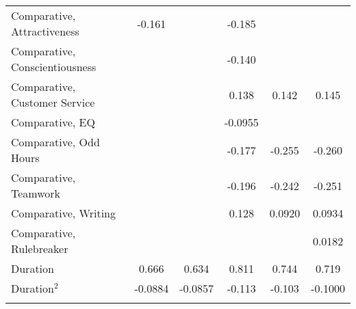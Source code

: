 {\begin{center}
{\begin{longtable}{l*{5}{c}}
Comparative, Attractiveness&                -0.161\sym{***}&                     &      -0.185\sym{*}  &                     &                     \\
\addlinespace
Comparative, Conscientiousness&                     &                     &      -0.140         &                     &                     \\
\addlinespace
Comparative, Customer Service&                     &                     &       0.138         &       0.142\sym{*}  &       0.145\sym{*}  \\
\addlinespace
Comparative, EQ          &                     &                     &     -0.0955         &                     &                     \\
\addlinespace
Comparative, Odd Hours&                     &                     &      -0.177\sym{*}  &      -0.255\sym{***}&      -0.260\sym{***}\\
\addlinespace
Comparative, Teamwork    &                     &                     &      -0.196\sym{*}  &      -0.242\sym{**} &      -0.251\sym{**} \\
\addlinespace
Comparative, Writing &                     &                     &       0.128         &      0.0920         &      0.0934         \\
\addlinespace
Comparative, Rulebreaker &                     &                     &                     &                     &      0.0182         \\
\addlinespace


Duration                 &       0.666\sym{**} &       0.634\sym{**} &       0.811\sym{***}&       0.744\sym{**} &       0.719\sym{**} \\
\addlinespace
Duration$^2$               &     -0.0884\sym{**} &     -0.0857\sym{**} &      -0.113\sym{***}&      -0.103\sym{**} &     -0.1000\sym{**} \\
\addlinespace



\end{longtable}}
\end{center}}
